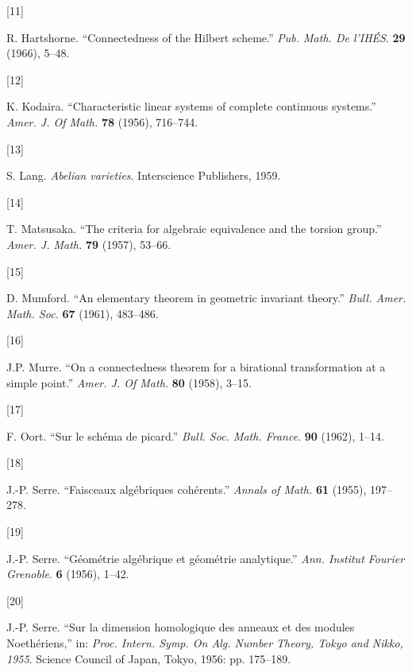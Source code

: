 \documentclass{article}
\newlength{\cslhangindent}
\newlength{\csllabelwidth}
\newenvironment{CSLReferences}[2] %
 {%
  \setlength{\parindent}{0pt}
  \ifodd #1 \everypar{\setlength{\hangindent}{\cslhangindent}}\ignorespaces\fi
  \setlength{\parskip}{0.75\baselineskip}
 }%
 {}
\newcommand{\CSLLeftMargin}[1]{\parbox[t]{\maxof{\widthof{#1}}{\csllabelwidth}}{#1}}
\newcommand{\CSLRightInline}[1]{\parbox[t]{\linewidth}{#1}}
\theoremstyle{definition}
\theoremstyle{definition}
\theoremstyle{definition}
\theoremstyle{definition}
\theoremstyle{remark}
\begin{document}
\begin{CSLReferences}{0}{0}
\leavevmode{}%
\CSLLeftMargin{{[}11{]} }%
\CSLRightInline{R. Hartshorne. {``Connectedness of the {Hilbert} scheme.''} \emph{Pub. Math. De l'IHÉS}. \textbf{29} (1966), 5--48.}

\leavevmode{}%
\CSLLeftMargin{{[}12{]} }%
\CSLRightInline{K. Kodaira. {``Characteristic linear systems of complete continuous systems.''} \emph{Amer. J. Of Math.} \textbf{78} (1956), 716--744.}

\leavevmode{}%
\CSLLeftMargin{{[}13{]} }%
\CSLRightInline{S. Lang. \emph{Abelian varieties}. Interscience Publishers, 1959.}

\leavevmode{}%
\CSLLeftMargin{{[}14{]} }%
\CSLRightInline{T. Matsusaka. {``The criteria for algebraic equivalence and the torsion group.''} \emph{Amer. J. Math.} \textbf{79} (1957), 53--66.}

\leavevmode{}%
\CSLLeftMargin{{[}15{]} }%
\CSLRightInline{D. Mumford. {``An elementary theorem in geometric invariant theory.''} \emph{Bull. Amer. Math. Soc.} \textbf{67} (1961), 483--486.}

\leavevmode{}%
\CSLLeftMargin{{[}16{]} }%
\CSLRightInline{J.P. Murre. {``On a connectedness theorem for a birational transformation at a simple point.''} \emph{Amer. J. Of Math.} \textbf{80} (1958), 3--15.}

\leavevmode{}%
\CSLLeftMargin{{[}17{]} }%
\CSLRightInline{F. Oort. {``Sur le schéma de picard.''} \emph{Bull. Soc. Math. France}. \textbf{90} (1962), 1--14.}

\leavevmode{}%
\CSLLeftMargin{{[}18{]} }%
\CSLRightInline{J.-P. Serre. {``Faisceaux algébriques cohérents.''} \emph{Annals of Math.} \textbf{61} (1955), 197--278.}

\leavevmode{}%
\CSLLeftMargin{{[}19{]} }%
\CSLRightInline{J.-P. Serre. {``Géométrie algébrique et géométrie analytique.''} \emph{Ann. Institut Fourier Grenoble}. \textbf{6} (1956), 1--42.}

\leavevmode{}%
\CSLLeftMargin{{[}20{]} }%
\CSLRightInline{J.-P. Serre. {``Sur la dimension homologique des anneaux et des modules {Noethériens},''} in: \emph{Proc. {Intern}. {Symp}. On Alg. Number Theory, {Tokyo} and {Nikko}, 1955}. {Science Council of Japan, Tokyo}, 1956: pp. 175--189.}


\end{CSLReferences}
\end{document}
